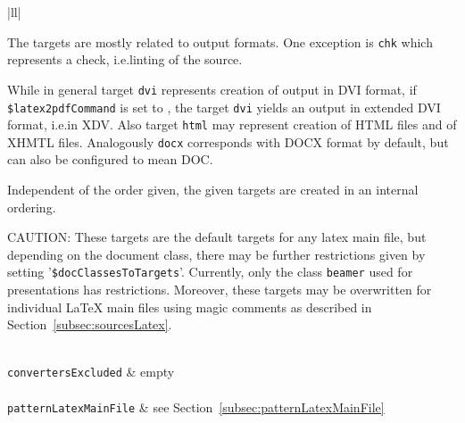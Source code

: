 \begin{longtable}{|ll|}
{\begin{minipage}{0.95\linewidth}
The targets are mostly related to output formats. 
One exception is \texttt{chk} which represents a check, i.e.\@ linting of the source. 

While in general target \texttt{dvi} represents creation of output in DVI format, 
if \texttt{\$latex2pdfCommand} is set to \xelatex, 
the target \texttt{dvi} yields an output in extended DVI format, i.e.\@ in XDV\@. 
Also target \texttt{html} may represent creation of HTML files and of XHMTL files. 
Analogously \texttt{docx} corresponds with DOCX format by default, 
but can also be configured to mean DOC\@. 

Independent of the order given, the given targets are created 
in an internal ordering. 

CAUTION\@: These targets are the default targets for any latex main file, 
but depending on the document class, there may be further restrictions 
given by setting '\texttt{\$docClassesToTargets}'. 
Currently, only the class \texttt{beamer} used for presentations has restrictions. 
Moreover, these targets may be overwritten for individual \LaTeX{} main files 
using magic comments as described in Section~\ref{subsec:sourcesLatex}. 

\end{minipage}
} \\
\texttt{convertersExcluded}          & empty     \\
 \\
\texttt{patternLatexMainFile} & see Section~\ref{subsec:patternLatexMainFile}\\
\end{longtable}
